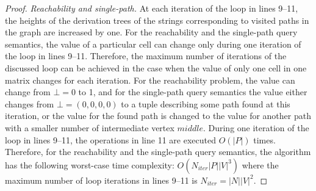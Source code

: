 \begin{proof}
\textit{Reachability and single-path.} %
At each iteration of the loop in lines 9--11, the heights of the derivation trees of the strings corresponding to visited paths in the graph are increased by one. For the reachability and the single-path query semantics, the value of a particular cell can change only during one iteration of the loop in lines 9--11. Therefore, the maximum number of iterations of the discussed loop can be achieved in the case when the value of only one cell in one matrix changes for each iteration. For the reachability problem, the value can change from $\bot = 0$ to 1, and for the single-path query semantics the value either changes from $\bot = (0, 0, 0, 0)$ to a tuple describing some path found at this iteration, or the value for the found path is changed to the value for another path with a smaller number of intermediate vertex $\textit{middle}$. During one iteration of the loop in lines 9--11, the operations in line 11 are executed $O(|P|)$ times. Therefore, for the reachability and the single-path query semantics, the algorithm has the following worst-case time complexity: $O(N_{\textit{iter}} |P||V|^3)$ where the maximum number of loop iterations in lines 9--11 is $N_{\textit{iter}} = |N||V|^2$.


\end{proof}
